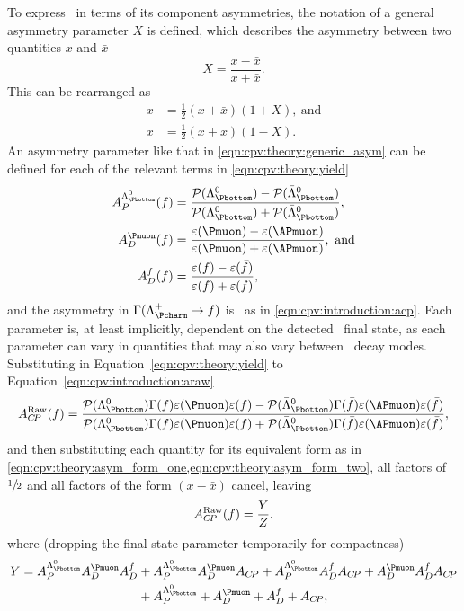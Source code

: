 To express \ARaw\ in terms of its component asymmetries, the notation of a
general asymmetry parameter $X$ is defined, which describes the asymmetry
between two quantities $x$ and $\bar{x}$
\begin{equation}
  X = \frac{x - \bar{x}}{x + \bar{x}}.
  \label{eqn:cpv:theory:generic_asym}
\end{equation}
This can be rearranged as
\begin{align}
  x &= \frac{1}{2}(x + \bar{x})(1 + X),\ \text{and}\label{eqn:cpv:theory:asym_form_one}\\
  \bar{x} &= \frac{1}{2}(x + \bar{x})(1 - X).\label{eqn:cpv:theory:asym_form_two}
\end{align}
An asymmetry parameter like that in \cref{eqn:cpv:theory:generic_asym} can be defined for each of the relevant terms in
\cref{eqn:cpv:theory:yield}
\begin{align*}
  \APLb(f) &= \frac{%
    \prob(\PLambdab) - \prob(\APLambdab)
  }{%
    \prob(\PLambdab) + \prob(\APLambdab)
  },\\
  \ADmu(f) &= \frac{%
    \eff(\Pmuon) - \eff(\APmuon)
  }{%
    \eff(\Pmuon) + \eff(\APmuon)
  },\ \text{and}\\
  \ADf(f)  &= \frac{%
    \eff(f) - \eff(\bar{f})
  }{%
    \eff(f) + \eff(\bar{f})
  },
\end{align*}
and the asymmetry in $\Gamma(\LcTof)$ is \ACP\ as in
\cref{eqn:cpv:introduction:acp}.
Each parameter is, at least implicitly, dependent on the detected \PLambdac\
final state, as each parameter can vary in quantities that may also vary
between \PLambdac\ decay modes.
Substituting in Equation~\ref{eqn:cpv:theory:yield} to
Equation~\ref{eqn:cpv:introduction:araw}
\begin{equation*}
  \ARaw(f) = \frac{%
    \prob(\PLambdab)\Gamma(f)\eff(\Pmuon)\eff(f) -
    \prob(\APLambdab)\Gamma(\bar{f})\eff(\APmuon)\eff(\bar{f})
  }{%
    \prob(\PLambdab)\Gamma(f)\eff(\Pmuon)\eff(f) +
    \prob(\APLambdab)\Gamma(\bar{f})\eff(\APmuon)\eff(\bar{f})
  },
\end{equation*}
and then substituting each quantity for its equivalent form as in
\cref{eqn:cpv:theory:asym_form_one,eqn:cpv:theory:asym_form_two}, all factors
of $\sfrac{1}{2}$ and all factors of the form $(x - \bar{x})$ cancel, leaving
\begin{equation}
  A_{C\!P}^{\textnormal{Raw}}(f) = \frac{Y}{Z}.
\end{equation}
where (dropping the final state parameter temporarily for compactness)
\begin{align}
  Y = \APLb\ADmu\ADf &+ \APLb\ADmu\ACP + \APLb\ADf\ACP + \ADmu\ADf\ACP \nonumber\\
                     &+ \APLb +  \ADmu + \ADf + \ACP,
\end{align}
